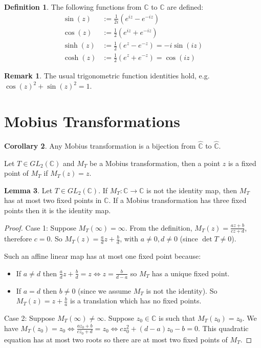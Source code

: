 \documentclass[12pt,a4paper]{article}
\theoremstyle{definition}
\newtheorem{definition}{Definition}[subsection]
\newtheorem{corollary}[definition]{Corollary}
\newtheorem{lemma}[definition]{Lemma}
\newtheorem*{remark}{Remark}
\begin{document}
\begin{definition}
	The following functions from $\mathbb{C}$ to $\mathbb{C}$ are defined:
	\[
		\begin{aligned}
			\sin(z) & := \frac{1}{2i} \left( e^{iz} - e^{-iz} \right) \\
			\cos(z) & := \frac{1}{2} \left( e^{iz} + e^{-iz} \right) \\
			\sinh(z) & := \frac{1}{2} \left( e^{z} - e^{-z} \right) = -i \sin(iz) \\
			\cosh(z) & := \frac{1}{2} \left( e^{z} + e^{-z} \right) = \cos(iz)
		\end{aligned}
	\]
\end{definition}

\begin{remark}
	The usual trigonometric function identities hold, e.g. $\cos(z)^2 + \sin(z)^2 = 1$.
\end{remark}

\section{Mobius Transformations}

\begin{corollary}
	Any Mobius transformation is a bijection from $\hat{\mathbb{C}}$ to $\hat{\mathbb{C}}$.
\end{corollary}

Let $T \in GL_2(\mathbb{C})$ and $M_T$ be a Mobius transformation, then a point $z$ is a fixed point of $M_T$ if $M_T(z) = z$.

\begin{lemma}
	Let $T \in GL_2(\mathbb{C})$. If $M_T: \mathbb{C} \rightarrow \mathbb{C}$ is not the identity map, then $M_T$ has at most two fixed points in $\mathbb{C}$. If a Mobius transformation has three fixed points then it is the identity map.
\end{lemma}

\begin{proof}
	Case 1: Suppose $M_T(\infty) = \infty$. From the definition, $M_T(z) = \frac{az + b}{cz + d}$, therefore $c = 0$. So $M_T(z) = \frac{a}{d}z + \frac{b}{d}$, with $a \ne 0, d \ne 0$ (since $\det T \ne 0$).

	Such an affine linear map has at most one fixed point because:
	\begin{itemize}
		\item If $a \ne d$ then $\frac{a}{d}z + \frac{b}{d} = z \Longleftrightarrow z = \frac{b}{d - a}$ so $M_T$ has a unique fixed point.
		\item If $a = d$ then $b \ne 0$ (since we assume $M_T$ is not the identity). So $M_T(z) = z + \frac{b}{a}$ is a translation which has no fixed points.
	\end{itemize}

	Case 2: Suppose $M_T(\infty) \ne \infty$. Suppose $z_0 \in \mathbb{C}$ is such that $M_T(z_0) = z_0$. We have $M_T(z_0) = z_0 \Longleftrightarrow \frac{a z_0 + b}{c z_0 + d} = z_0 \Longleftrightarrow c z_0 ^ 2 + (d - a)z_0 - b = 0$. This quadratic equation has at most two roots so there are at most two fixed points of $M_T$.
\end{proof}
\end{document}
